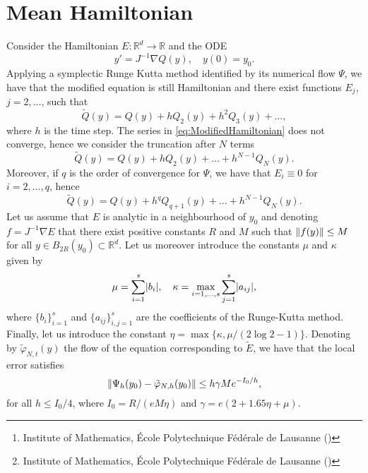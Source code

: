 \documentclass{siamart1116}
\title{{\TheTitle}}
\author{Assyr Abdulle\thanks{Institute of Mathematics, \'Ecole Polytechnique F\'ed\'erale de Lausanne (\email{assyr.abdulle@epfl.ch})}
		\and
		Giacomo Garegnani\thanks{Institute of Mathematics, \'Ecole Polytechnique F\'ed\'erale de Lausanne (\email{giacomo.garegnani@epfl.ch})}}
\numberwithin{theorem}{section}
\DeclarePairedDelimiter{\abs}{\lvert}{\rvert}
\DeclarePairedDelimiter{\norm}{\|}{\|}
\renewcommand{\phi}{\varphi}
\newcommand{\R}{\mathbb{R}}
\begin{document}
\maketitle

\section{Mean Hamiltonian} Consider the Hamiltonian $E\colon \R^d \to \R$ and the ODE
\begin{equation}
	y' = J^{-1}\nabla Q(y), \quad y(0) = y_0.
\end{equation}
Applying a symplectic Runge Kutta method identified by its numerical flow $\Psi$, we have that the modified equation is still Hamiltonian and there exist functions $E_j$, $j = 2, \ldots$, such that
\begin{equation}\label{eq:ModifiedHamiltonian}
	\tilde Q(y) = Q(y) + h Q_2(y) + h^2 Q_3(y) + \ldots,
\end{equation}
where $h$ is the time step. The series in \eqref{eq:ModifiedHamiltonian} does not converge, hence we consider the truncation after $N$ terms 
\begin{equation}
	\tilde Q(y) = Q(y) + h Q_2(y) + \ldots + h^{N-1} Q_N(y).
\end{equation}
Moreover, if $q$ is the order of convergence for $\Psi$, we have that $E_i \equiv 0$ for $i = 2, \ldots, q$, hence
\begin{equation}\label{eq:ModifiedHamiltonianTrunc}
	\tilde Q(y) = Q(y) + h^q Q_{q+1}(y) + \ldots + h^{N-1} Q_N(y).
\end{equation}
Let us assume that $E$ is analytic in a neighbourhood of $y_0$ and denoting $f = J^{-1}\nabla E$ that there exist positive constants $R$ and $M$ such that $\norm{f(y)} \leq M$ for all $y \in B_{2R}(y_0) \subset \R^d$. Let us moreover introduce the constants $\mu$ and $\kappa$ given by
\begin{equation}
	\mu = \sum_{i=1}^{s} \abs{b_i}, \quad \kappa = \max_{i=1, \ldots, s} \sum_{j=1}^{s} \abs{a_{ij}},
\end{equation}
where $\{b_i\}_{i=1}^s$ and $\{a_{ij}\}_{i,j=1}^s$ are the coefficients of the Runge-Kutta method. Finally, let us introduce the constant $\eta = \max\{\kappa, \mu/(2\log 2 - 1)\}$. Denoting by $\tilde \phi_{N,t}(y)$ the flow of the equation corresponding to $\tilde E$, we have that the local error satisfies \cite[Theorem IX.7.6]{HLW06}
\begin{equation}\label{eq:LocalErrorModified}
	\norm{\Psi_h(y_0) - \tilde \phi_{N,h}(y_0)} \leq h \gamma M e^{-I_0 / h},
\end{equation}
for all $h \leq I_0 / 4$, where $I_0 = R / (eM\eta)$ and $\gamma = e(2 + 1.65\eta + \mu)$.
\end{document}
